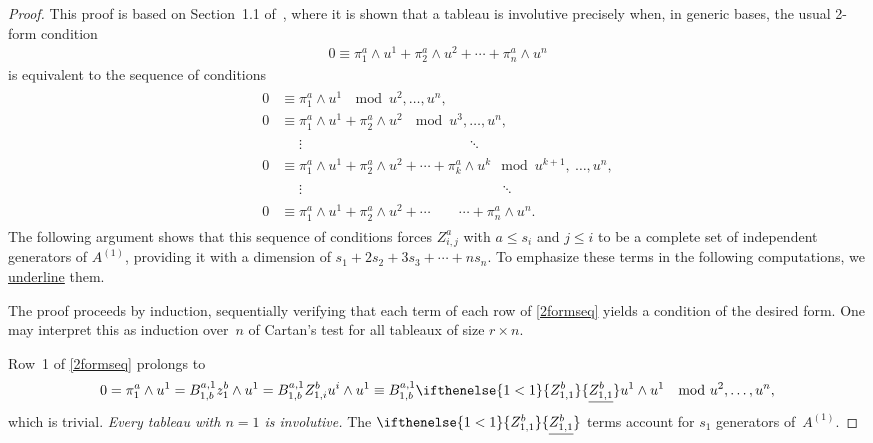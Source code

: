 \documentclass[11pt]{article}
\numberwithin{equation}{section}
\newcommand{\Z}[3]{\ifthenelse{#1<#2}{\ensuremath{Z^{#3}_{#1,#2}}}{\ensuremath{\underline{Z^{#3}_{#1,#2}}}}}
\begin{document}
\begin{proof}
This proof is based on Section~1.1 of~\cite{Yang1987}, where it is shown that a
tableau is involutive precisely when, in generic bases, the usual 2-form condition
\begin{gather*}
0 \equiv \pi^a_1 \wedge u^1 + \pi^a_2 \wedge u^2 +
\cdots + \pi^a_n\wedge u^n
\label{2form}
\end{gather*}
is equivalent to the sequence of conditions
\begin{gather}
\begin{split}
0 &\equiv \pi^a_1 \wedge u^1 \ \mod  u^2, \ldots, u^n, \\
0 &\equiv \pi^a_1 \wedge u^1 + \pi^a_2 \wedge u^2 \ \mod  u^3, \ldots, u^n, \\
  &\phantom{=}\vdots \phantom{\pi^a_1 \wedge u^1 + \pi^a_2 \wedge u^2 + \pi^a_3 \wedge u^3}\ddots \\
0 &\equiv \pi^a_1 \wedge u^1 + \pi^a_2 \wedge u^2 + \cdots + \pi^a_k
\wedge u^k  \mod  u^{k+1},\ \ldots, u^n, \\
  &\phantom{=}\vdots \phantom{\pi^a_1 \wedge u^1 + \pi^a_2 \wedge u^2 + \cdots + \pi^a_i \wedge u^i,}\ddots
      \\
0 &\equiv  \pi^a_1 \wedge u^1 + \pi^a_2 \wedge u^2 +
 \cdots\qquad\cdots + \pi^a_n\wedge u^n.
\end{split}
\label{2formseq}
\end{gather}
The following argument shows that this sequence of conditions forces $Z^a_{i,j}$ with $a
\leq s_i$ and $j \leq i$ to be a complete set of independent generators of
$A^{(1)}$, providing it with a dimension of $s_1 + 2s_2 + 3s_3 + \cdots + n
s_n$.   To emphasize these terms in the following computations, we
\underline{underline} them.

The proof proceeds by induction, sequentially verifying that each term of
each row of \eqref{2formseq} yields a condition of the desired form.  One may
interpret this as induction over~$n$ of Cartan's test for all tableaux
of size $r \times n$.

Row~1 of \eqref{2formseq} prolongs to
\begin{gather*}
0 = \pi^a_1 \wedge u^1
  = B^{a,1}_{1,b} z^b_1 \wedge u^1
  = B^{a,1}_{1,b} Z^b_{1,i} u^i \wedge u^1
  \equiv
     B^{a,1}_{1,b} \Z{1}{1}{b} u^1 \wedge u^1 \  \mod u^2, \ldots, u^n,
\end{gather*}
which is trivial.  \emph{Every tableau with $n=1$ is
involutive.}   The $\Z{1}{1}{b}$ terms account for $s_1$ generators
of~$A^{(1)}$.


\end{proof}
\end{document}

